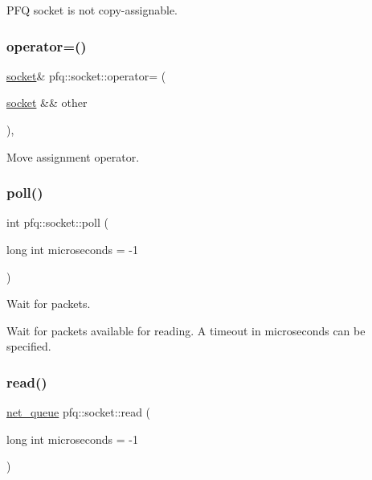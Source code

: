 P\+FQ socket is not copy-\/assignable. 

\mbox{\label{classpfq_1_1socket_a8022eafa68b84a840292ebcfc4d1ba7a}} 
\subsubsection{\texorpdfstring{operator=()}{operator=()}\hspace{0.1cm}{\footnotesize\ttfamily [2/2]}}
{\footnotesize\ttfamily \hyperlink{classpfq_1_1socket}{socket}\& pfq\+::socket\+::operator= (\begin{DoxyParamCaption}\item[{\hyperlink{classpfq_1_1socket}{socket} \&\&}]{other }\end{DoxyParamCaption})\hspace{0.3cm}{\ttfamily [inline]}, {\ttfamily [noexcept]}}



Move assignment operator. 

\mbox{\label{classpfq_1_1socket_ad8ce551ea07f39317bb383ab88d66344}} 
\subsubsection{\texorpdfstring{poll()}{poll()}}
{\footnotesize\ttfamily int pfq\+::socket\+::poll (\begin{DoxyParamCaption}\item[{long int}]{microseconds = {\ttfamily -\/1} }\end{DoxyParamCaption})\hspace{0.3cm}{\ttfamily [inline]}}



Wait for packets. 

Wait for packets available for reading. A timeout in microseconds can be specified. \mbox{\label{classpfq_1_1socket_a6004249d3abfe8a2329b44ba797d1909}} 
\subsubsection{\texorpdfstring{read()}{read()}}
{\footnotesize\ttfamily \hyperlink{classpfq_1_1net__queue}{net\+\_\+queue} pfq\+::socket\+::read (\begin{DoxyParamCaption}\item[{long int}]{microseconds = {\ttfamily -\/1} }\end{DoxyParamCaption})\hspace{0.3cm}{\ttfamily [inline]}}



